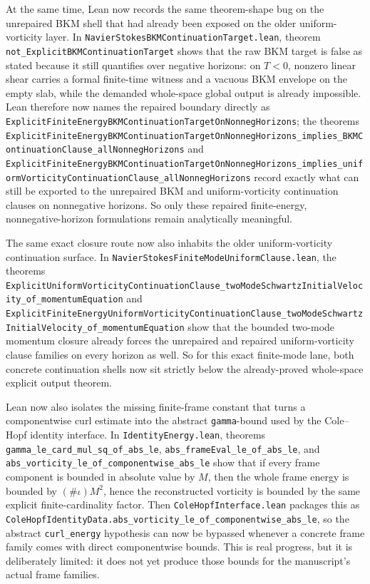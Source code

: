 \documentclass[11pt]{article}
\theoremstyle{remark}
\begin{document}
At the same time, Lean now records the same theorem-shape bug on the unrepaired
BKM shell that had already been exposed on the older uniform-vorticity layer.
In \texttt{NavierStokesBKMContinuationTarget.lean}, theorem
\texttt{not\_ExplicitBKMContinuationTarget} shows that the raw BKM target is
false as stated because it still quantifies over negative horizons: on
\(T<0\), nonzero linear shear carries a formal finite-time witness and a
vacuous BKM envelope on the empty slab, while the demanded whole-space global
output is already impossible.  Lean therefore now names the repaired boundary
directly as
\texttt{ExplicitFiniteEnergyBKMContinuationTargetOnNonnegHorizons}; the theorems
\texttt{ExplicitFiniteEnergyBKMContinuationTargetOnNonnegHorizons\_implies\_BKMContinuationClause\_allNonnegHorizons}
and
\texttt{ExplicitFiniteEnergyBKMContinuationTargetOnNonnegHorizons\_implies\_uniformVorticityContinuationClause\_allNonnegHorizons}
record exactly what can still be exported to the unrepaired BKM and
uniform-vorticity continuation clauses on nonnegative horizons.  So only these
repaired finite-energy, nonnegative-horizon formulations remain analytically
meaningful.

The same exact closure route now also inhabits the older uniform-vorticity
continuation surface.  In
\texttt{NavierStokesFiniteModeUniformClause.lean}, the theorems
\texttt{ExplicitUniformVorticityContinuationClause\_twoModeSchwartzInitialVelocity\_of\_momentumEquation}
and
\texttt{ExplicitFiniteEnergyUniformVorticityContinuationClause\_twoModeSchwartzInitialVelocity\_of\_momentumEquation}
show that the bounded two-mode momentum closure already forces the unrepaired
and repaired uniform-vorticity clause families on every horizon as well.  So
for this exact finite-mode lane, both concrete continuation shells now sit
strictly below the already-proved whole-space explicit output theorem.

Lean now also isolates the missing finite-frame constant that turns a
componentwise curl estimate into the abstract \texttt{gamma}-bound used by the
Cole--Hopf identity interface.  In \texttt{IdentityEnergy.lean}, theorems
\texttt{gamma\_le\_card\_mul\_sq\_of\_abs\_le},
\texttt{abs\_frameEval\_le\_of\_abs\_le}, and
\texttt{abs\_vorticity\_le\_of\_componentwise\_abs\_le} show that if every
frame component is bounded in absolute value by \(M\), then the whole frame
energy is bounded by \((\#\iota) M^2\), hence the reconstructed vorticity is
bounded by the same explicit finite-cardinality factor.  Then
\texttt{ColeHopfInterface.lean} packages this as
\texttt{ColeHopfIdentityData.abs\_vorticity\_le\_of\_componentwise\_abs\_le},
so the abstract \texttt{curl\_energy} hypothesis can now be bypassed whenever
a concrete frame family comes with direct componentwise bounds.  This is real
progress, but it is deliberately limited: it does not yet produce those bounds
for the manuscript's actual frame families.
\end{document}
